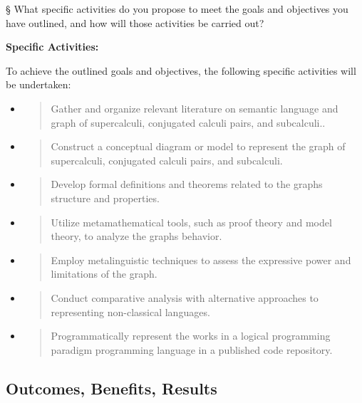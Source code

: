 § What specific activities do you propose to meet the goals and
objectives you have outlined, and how will those activities be carried
out?

\textbf{Specific Activities:}

To achieve the outlined goals and objectives, the following specific
activities will be undertaken:

\begin{itemize}
\item
  \begin{quote}
  Gather and organize relevant literature on semantic language and graph
  of supercalculi, conjugated calculi pairs, and subcalculi..
  \end{quote}
\item
  \begin{quote}
  Construct a conceptual diagram or model to represent the graph of
  supercalculi, conjugated calculi pairs, and subcalculi.
  \end{quote}
\item
  \begin{quote}
  Develop formal definitions and theorems related to the
  graph\textquotesingle s structure and properties.
  \end{quote}
\item
  \begin{quote}
  Utilize metamathematical tools, such as proof theory and model theory,
  to analyze the graph\textquotesingle s behavior.
  \end{quote}
\item
  \begin{quote}
  Employ metalinguistic techniques to assess the expressive power and
  limitations of the graph.
  \end{quote}
\item
  \begin{quote}
  Conduct comparative analysis with alternative approaches to
  representing non-classical languages.
  \end{quote}
\item
  \begin{quote}
  Programmatically represent the works in a logical programming paradigm
  programming language in a published code repository.
  \end{quote}
\end{itemize}

\hypertarget{outcomes-benefits-results}{%
\subsection{\texorpdfstring{\textbf{Outcomes, Benefits,
Results}}{Outcomes, Benefits, Results}}\label{outcomes-benefits-results}}

